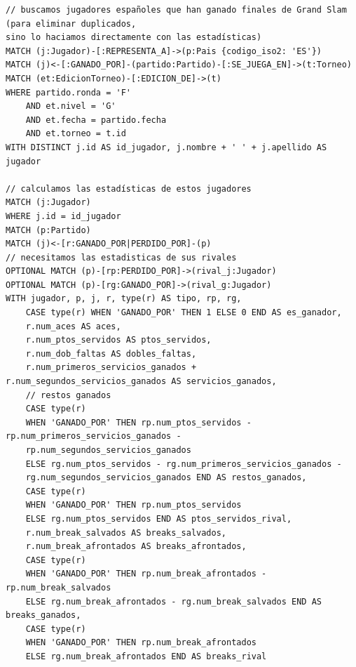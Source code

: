 \begin{verbatim}
// buscamos jugadores españoles que han ganado finales de Grand Slam (para eliminar duplicados, 
sino lo haciamos directamente con las estadísticas)
MATCH (j:Jugador)-[:REPRESENTA_A]->(p:Pais {codigo_iso2: 'ES'})
MATCH (j)<-[:GANADO_POR]-(partido:Partido)-[:SE_JUEGA_EN]->(t:Torneo)
MATCH (et:EdicionTorneo)-[:EDICION_DE]->(t)
WHERE partido.ronda = 'F'
    AND et.nivel = 'G'
    AND et.fecha = partido.fecha
    AND et.torneo = t.id
WITH DISTINCT j.id AS id_jugador, j.nombre + ' ' + j.apellido AS jugador

// calculamos las estadísticas de estos jugadores
MATCH (j:Jugador)
WHERE j.id = id_jugador
MATCH (p:Partido)
MATCH (j)<-[r:GANADO_POR|PERDIDO_POR]-(p)
// necesitamos las estadisticas de sus rivales
OPTIONAL MATCH (p)-[rp:PERDIDO_POR]->(rival_j:Jugador)
OPTIONAL MATCH (p)-[rg:GANADO_POR]->(rival_g:Jugador)
WITH jugador, p, j, r, type(r) AS tipo, rp, rg,
    CASE type(r) WHEN 'GANADO_POR' THEN 1 ELSE 0 END AS es_ganador,
    r.num_aces AS aces,
    r.num_ptos_servidos AS ptos_servidos,
    r.num_dob_faltas AS dobles_faltas,
    r.num_primeros_servicios_ganados + r.num_segundos_servicios_ganados AS servicios_ganados,
    // restos ganados
    CASE type(r)
    WHEN 'GANADO_POR' THEN rp.num_ptos_servidos - rp.num_primeros_servicios_ganados - 
    rp.num_segundos_servicios_ganados
    ELSE rg.num_ptos_servidos - rg.num_primeros_servicios_ganados - 
    rg.num_segundos_servicios_ganados END AS restos_ganados,
    CASE type(r)
    WHEN 'GANADO_POR' THEN rp.num_ptos_servidos
    ELSE rg.num_ptos_servidos END AS ptos_servidos_rival,
    r.num_break_salvados AS breaks_salvados,
    r.num_break_afrontados AS breaks_afrontados,
    CASE type(r)
    WHEN 'GANADO_POR' THEN rp.num_break_afrontados - rp.num_break_salvados
    ELSE rg.num_break_afrontados - rg.num_break_salvados END AS breaks_ganados,
    CASE type(r)
    WHEN 'GANADO_POR' THEN rp.num_break_afrontados
    ELSE rg.num_break_afrontados END AS breaks_rival


\end{verbatim}
